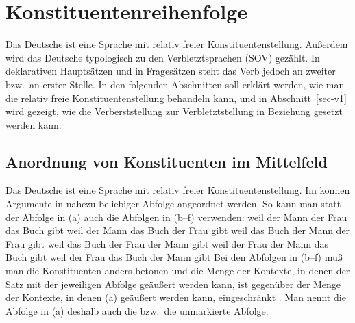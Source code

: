 
\chapter{Konstituentenreihenfolge}
\label{chap-Konstituentenreihenfolge}

Das Deutsche ist eine Sprache mit relativ freier Konstituentenstellung.
Außerdem wird das Deutsche typologisch zu den Verbletztsprachen (SOV) gezählt.
In deklarativen Hauptsätzen und in Fragesätzen steht das Verb jedoch an zweiter
bzw.\ an erster Stelle. In den folgenden Abschnitten soll erklärt werden, wie man
die relativ freie Konstituentenstellung behandeln kann, und in Abschnitt~\ref{sec-v1}
wird gezeigt, wie die Verberststellung zur Verbletztstellung in Beziehung gesetzt werden
kann.

\section{Anordnung von Konstituenten im Mittelfeld}
\label{sec-mf}

Das Deutsche ist eine Sprache mit relativ freier Konstituentenstellung.
Im \mf können Argumente in nahezu beliebiger Abfolge angeordnet werden.
So kann man statt der Abfolge in (a) auch die Abfolgen in (b--f)
verwenden:
\eal
\label{bsp-perm-mf}
\ex weil der Mann der Frau das Buch gibt
\ex weil der Mann das Buch der Frau gibt
\ex weil das Buch der Mann der Frau gibt
\ex weil das Buch der Frau der Mann gibt
\ex weil der Frau der Mann das Buch gibt
\ex weil der Frau das Buch der Mann gibt
\zl
Bei den Abfolgen in (b--f) muß man die Konstituenten anders betonen
und die Menge der Kontexte, in denen der Satz mit der jeweiligen Abfolge
geäußert werden kann, ist gegenüber der Menge der Kontexte, in denen (a)
geäußert werden kann, eingeschränkt \citep{Hoehle82a}. Man nennt die
Abfolge in (a) deshalb auch die  bzw.\ die unmarkierte
Abfolge.

